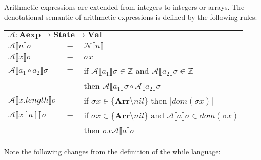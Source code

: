 \documentclass{article}
\begin{document}
Arithmetic expressions are extended from integers to integers or arrays.
The denotational semantic of arithmetic expressions is defined by the following rules:
\begin{center}
\begin{tabular}{ l c l }
\multicolumn{3}{l}{\(\mathcal{A}: \textbf{Aexp} \rightarrow \textbf{State} \rightarrow \textbf{Val}\)} \\
 \(\mathcal{A}\llbracket n \rrbracket \sigma \) & \(=\) & \(\mathcal{N}\llbracket n \rrbracket\)\\ 
 \(\mathcal{A}\llbracket x \rrbracket \sigma \) & \(=\) & \(\sigma x\)\\  
 \(\mathcal{A}\llbracket a_1 \circ a_2 \rrbracket \sigma \) & \(=\) &
    if \(\mathcal{A}\llbracket a_1\rrbracket \sigma \in \mathbb{Z}\) and \(\mathcal{A}\llbracket a_2\rrbracket \sigma \in \mathbb{Z}\)\\
    & & then \(\mathcal{A}\llbracket a_1\rrbracket \sigma \circ \mathcal{A}\llbracket a_2\rrbracket \sigma\)\\ 
 \(\mathcal{A}\llbracket x.length \rrbracket \sigma \) & \(=\) & if \(\sigma x \in \{\textbf{Arr} \setminus {nil}\}\) then \(|dom(\sigma x)|\) \\ 
 \(\mathcal{A}\llbracket x[a] \rrbracket \sigma \) & \(=\) &
    if \(\sigma x \in \{\textbf{Arr} \setminus {nil}\}\) and \(\mathcal{A}\llbracket a\rrbracket \sigma \in dom(\sigma x)\)\\
    & & then \(\sigma x \mathcal{A}\llbracket a\rrbracket \sigma\)\\ 
\end{tabular}
\end{center}
Note the following changes from the definition of the while language:
\end{document}
